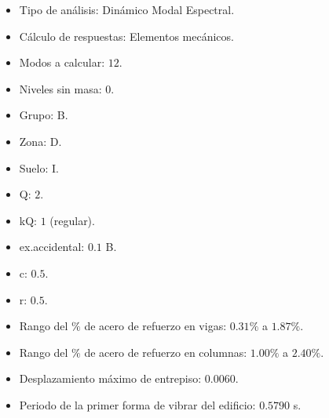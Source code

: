 \begin{itemize}
	\item Tipo de an\'alisis: Din\'amico Modal Espectral.
	\item C\'alculo de respuestas: Elementos mec\'anicos.
	\item Modos a calcular: $12$.
	\item Niveles sin masa: $0$.
	\item Grupo: B.
	\item Zona: D.
	\item Suelo: I.
	\item Q: $2$.
	\item kQ: $1$ (regular).
	\item ex.accidental: $0.1$ B.
	\item c: $0.5$.
	\item r: $0.5$.
	\item Rango del $\%$ de acero de refuerzo en vigas: $0.31\%$ a $1.87\%$.
	\item Rango del $\%$ de acero de refuerzo en columnas: $1.00\%$ a $2.40\%$.
	\item Desplazamiento m\'aximo de entrepiso: $0.0060$.
	\item Periodo de la primer forma de vibrar del edificio: $0.5790$ s.
\end{itemize}


